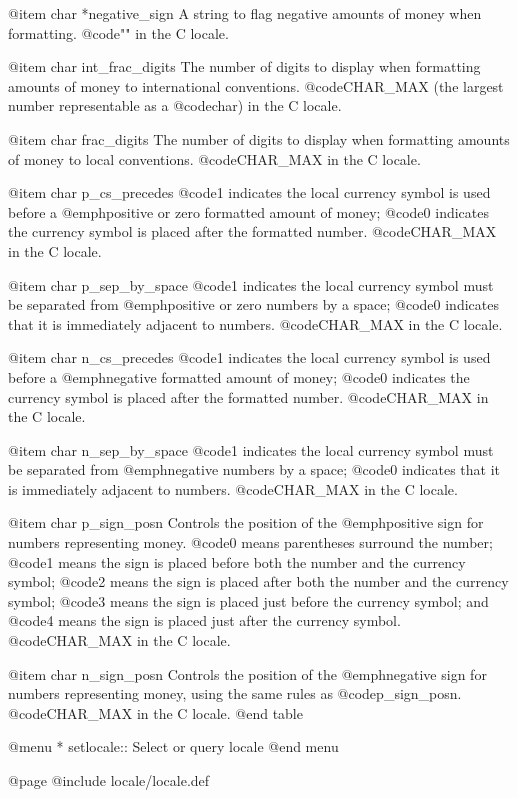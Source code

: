 @item char *negative_sign
A string to flag negative amounts of money when formatting.
@code{""} in the C locale.

@item char int_frac_digits
The number of digits to display when formatting amounts of money to
international conventions.
@code{CHAR_MAX} (the largest number representable as a @code{char}) in
the C locale. 

@item char frac_digits
The number of digits to display when formatting amounts of money to
local conventions.
@code{CHAR_MAX} in the C locale. 

@item char p_cs_precedes
@code{1} indicates the local currency symbol is used before a
@emph{positive or zero} formatted amount of money; @code{0} indicates
the currency symbol is placed after the formatted number.
@code{CHAR_MAX} in the C locale. 

@item char p_sep_by_space
@code{1} indicates the local currency symbol must be separated from
@emph{positive or zero} numbers by a space; @code{0} indicates that it
is immediately adjacent to numbers.
@code{CHAR_MAX} in the C locale. 

@item char n_cs_precedes
@code{1} indicates the local currency symbol is used before a
@emph{negative} formatted amount of money; @code{0} indicates
the currency symbol is placed after the formatted number.
@code{CHAR_MAX} in the C locale. 

@item char n_sep_by_space
@code{1} indicates the local currency symbol must be separated from
@emph{negative} numbers by a space; @code{0} indicates that it
is immediately adjacent to numbers.
@code{CHAR_MAX} in the C locale. 

@item char p_sign_posn
Controls the position of the @emph{positive} sign for
numbers representing money.  @code{0} means parentheses surround the
number; @code{1} means the sign is placed before both the number and the
currency symbol; @code{2} means the sign is placed after both the number
and the currency symbol; @code{3} means the sign is placed just before
the currency symbol; and @code{4} means the sign is placed just after
the currency symbol.
@code{CHAR_MAX} in the C locale. 

@item char n_sign_posn
Controls the position of the @emph{negative} sign for numbers
representing money, using the same rules as @code{p_sign_posn}.
@code{CHAR_MAX} in the C locale. 
@end table

@menu
* setlocale::  Select or query locale
@end menu

@page
@include locale/locale.def
